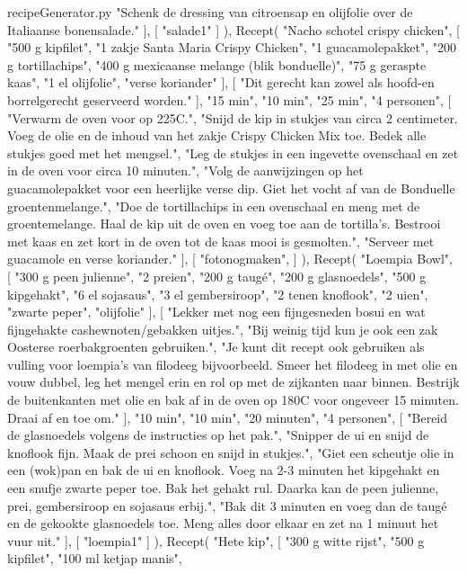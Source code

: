 \begin{filecontents*}{recipeGenerator.py}
		"Schenk de dressing van citroensap en olijfolie over de Italiaanse bonensalade."
	],
	[
		"salade1"
	]
),
Recept(
	"Nacho schotel crispy chicken",
	[
		"500 g kipfilet",
		"1 zakje Santa Maria Crispy Chicken",
		"1 guacamolepakket",
		"200 g tortillachips",
		"400 g mexicaanse melange (blik bonduelle)",
		"75 g geraspte kaas",
		"1 el olijfolie",
		"verse koriander"
	],
	[
		"Dit gerecht kan zowel als hoofd-en borrelgerecht geserveerd worden."
	],
	"15 min",
	"10 min",
	"25 min",
	"4 personen",
	[
		"Verwarm de oven voor op 225\degree C.",
		"Snijd de kip in stukjes van circa 2 centimeter. Voeg de olie en de inhoud van het zakje Crispy Chicken Mix toe. Bedek alle stukjes goed met het mengsel.",
		"Leg de stukjes in een ingevette ovenschaal en zet in de oven voor circa 10 minuten.",
		"Volg de aanwijzingen op het guacamolepakket voor een heerlijke verse dip. Giet het vocht af van de Bonduelle groentenmelange.",
		"Doe de tortillachips in een ovenschaal en meng met de groentemelange. Haal de kip uit de oven en voeg toe aan de tortilla's. Bestrooi met kaas en zet kort in de oven tot de kaas mooi is gesmolten.",
		"Serveer met guacamole en verse koriander."
	],
	[
	"fotonogmaken",
	]
),
Recept(
	"Loempia Bowl",
	[
		"300 g peen julienne",
		"2 preien",
		"200 g taugé",
		"200 g glasnoedels",
		"500 g kipgehakt",
		"6 el sojasaus",
		"3 el gembersiroop",
		"2 tenen knoflook",
		"2 uien",
		"zwarte peper",
		"olijfolie"
	],
	[
		"Lekker met nog een fijngesneden bosui en wat fijngehakte cashewnoten/gebakken uitjes.",
		"Bij weinig tijd kun je ook een zak Oosterse roerbakgroenten gebruiken.",
		"Je kunt dit recept ook gebruiken als vulling voor loempia's van filodeeg bijvoorbeeld. Smeer het filodeeg in met olie en vouw dubbel, leg het mengel erin en rol op met de zijkanten naar binnen. Bestrijk de buitenkanten met olie en bak af in de oven op 180\degree C voor ongeveer 15 minuten. Draai af en toe om."
	],
	"10 min",
	"10 min",
	"20 minuten",
	"4 personen",
	[
		"Bereid de glasnoedels volgens de instructies op het pak.",
		"Snipper de ui en snijd de knoflook fijn. Maak de prei schoon en snijd in stukjes.",
		"Giet een scheutje olie in een (wok)pan en bak de ui en knoflook. Voeg na 2-3 minuten het kipgehakt en een snufje zwarte peper toe. Bak het gehakt rul. Daarka kan de peen julienne, prei, gembersiroop en sojasaus erbij.",
		"Bak dit 3 minuten en voeg dan de taugé en de gekookte glasnoedels toe. Meng alles door elkaar en zet na 1 minuut het vuur uit."
	],
	[
		"loempia1"
	]
),
Recept(
	"Hete kip",
	[
		"300 g witte rijst",
		"500 g kipfilet",
		"100 ml ketjap manis",

\end{filecontents*}
